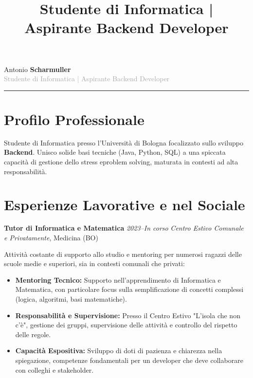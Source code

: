 \documentclass[10pt,a4paper,sans]{moderncv}
\title{Studente di Informatica | Aspirante Backend Developer}
\begin{document}
\begin{minipage}[t]{0.70\textwidth}
\vspace{0pt} %

{\fontsize{24}{28}\selectfont\textcolor{color1}{Antonio \textbf{Scharmuller}}}\\[1ex]
{\large\textcolor{darkgray}{Studente di Informatica | Aspirante Backend Developer}}\\[1ex]
{\color{color1}\rule{\textwidth}{0.4pt}}\vspace{3mm}

\section{Profilo Professionale}
Studente di Informatica presso l'Università di Bologna focalizzato sullo sviluppo \textbf{Backend}. Unisco solide basi tecniche (Java, Python, SQL) a una spiccata capacità di gestione dello stress eproblem solving, maturata in contesti ad alta responsabilità.

\section{Esperienze Lavorative e nel Sociale}



\vspace{2mm}

{\noindent\textbf{Tutor di Informatica e Matematica} \hfill \textit{2023--In corso}\newline
\textit{Centro Estivo Comunale e Privatamente}, Medicina (BO)}\\[1mm]
{\small
Attività costante di supporto allo studio e mentoring per numerosi ragazzi delle scuole medie e superiori, sia in contesti comunali che privati:
\vspace{1mm}
\begin{itemize}
  \item \textbf{Mentoring Tecnico:} Supporto nell'apprendimento di Informatica e Matematica, con particolare focus sulla semplificazione di concetti complessi (logica, algoritmi, basi matematiche).
  \item \textbf{Responsabilità e Supervisione:} Presso il Centro Estivo "L'isola che non c'è", gestione dei gruppi, supervisione delle attività e controllo del rispetto delle regole.
  \item \textbf{Capacità Espositiva:} Sviluppo di doti di pazienza e chiarezza nella spiegazione, competenze fondamentali per un developer che deve collaborare con colleghi e stakeholder.
\end{itemize}
}


\end{minipage}
\end{document}
